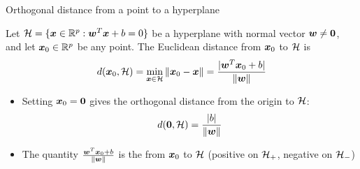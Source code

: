 \documentclass[aspectratio=169]{beamer}\usepackage[]{graphicx}\usepackage[]{xcolor}
\begin{document}
\begin{frame}{Orthogonal distance from a point to a hyperplane}
    \begin{importanttheorem}
        \label{th:distance-point-hyperplane}
        Let $\mathcal{H} = \{\bm{x} \in \mathbb{R}^p : \bm{w}^T \bm{x} + b = 0\}$ be a hyperplane with normal vector $\bw \neq \b0$, and let $\bm{x}_0 \in \mathbb{R}^p$ be any point. The Euclidean distance from $\bm{x}_0$ to $\mathcal{H}$ is
        \[
            d(\bm{x}_0, \mathcal{H}) = \min_{\bm{x} \in \mathcal{H}} \|\bm{x}_0 - \bm{x}\| = \frac{|\bm{w}^T \bm{x}_0 + b|}{\|\bm{w}\|}
        \]
    \end{importanttheorem}
    \vfill
    \begin{itemize}
        \item Setting $\bx_0 = \b0$ gives the orthogonal distance from the origin to $\mathcal{H}$:
        \[
            d(\b0, \H) = \frac{|b|}{\|\bw\|}
        \]
        \item The quantity $\frac{\bm{w}^T \bm{x}_0 + b}{\|\bm{w}\|}$ is the  from $\bm{x}_0$ to $\mathcal{H}$ (positive on $\mathcal{H}_+$, negative on $\mathcal{H}_-$)
    \end{itemize}
\end{frame}
\end{document}
